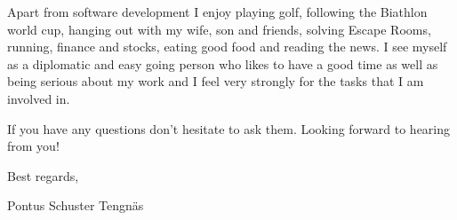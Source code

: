 Apart from software development I enjoy playing golf, following the Biathlon world cup,
hanging out with my wife, son and friends, solving Escape Rooms, running, finance and stocks,
 eating good food and reading the news. I see myself as a diplomatic
and easy going person who likes to have a good time as well as being serious about my work and
I feel very strongly for the tasks that I am involved in.

If you have any questions don’t hesitate to ask them. Looking forward to hearing from you!

Best regards,

Pontus Schuster Tengnäs
